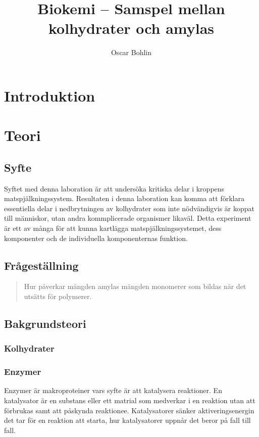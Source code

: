 \documentclass[a4paper,12pt]{article}
\title{Biokemi \--- Samspel mellan kolhydrater och amylas}
\author{Oscar Bohlin}
\begin{document}
\maketitle
\newpage
{}
\tableofcontents
\newpage


\section{Introduktion}

\section{Teori}

\subsection{Syfte}

	Syftet med denna laboration är att undersöka kritiska delar i kroppens matspjälkningssystem. Resultaten i denna laboration kan komma att förklara essentiella delar i nedbrytningen av kolhydrater som inte nödvändigvis är koppat till människor, utan andra kommplicerade organismer likaväl. Detta experiment är ett av många för att kunna kartlägga matspjälkningssystemet, dess komponenter och de individuella komponenternas funktion. 

\subsection{Frågeställning}

	\begin{quotation}
		Hur påverkar mängden amylas mängden monomerer som bildas när det utsätts för polymerer.
	\end{quotation}

\subsection{Bakgrundsteori}

\subsubsection{Kolhydrater}

\subsubsection{Enzymer}

	Enzymer är makroproteiner vars syfte är att katalysera reaktioner. En katalysator är en substans eller ett matrial som medverkar i en reaktion utan att förbrukas samt att påskynda reaktionee. Katalysatorer sänker aktiveringsenergin det tar för en reaktion att starta, hur katalysatorer uppnår det beror på fall till fall. 
	
\end{document}

